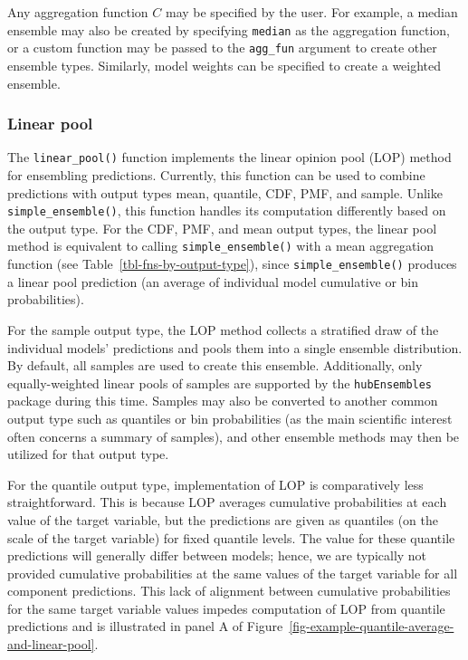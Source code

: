 \documentclass[
  letterpaper,
  DIV=11,
  numbers=noendperiod]{scrartcl}
\begin{document}
Any aggregation function \(C\) may be specified by the user. For
example, a median ensemble may also be created by specifying
\texttt{median} as the aggregation function, or a custom function may be
passed to the \texttt{agg\_fun} argument to create other ensemble types.
Similarly, model weights can be specified to create a weighted ensemble.

\subsubsection{Linear pool}\label{sec-linear-pool}

The \texttt{linear\_pool()} function implements the linear opinion pool
(LOP) method for ensembling predictions. Currently, this function can be
used to combine predictions with output types mean, quantile, CDF, PMF,
and sample. Unlike \texttt{simple\_ensemble()}, this function handles
its computation differently based on the output type. For the CDF, PMF,
and mean output types, the linear pool method is equivalent to calling
\texttt{simple\_ensemble()} with a mean aggregation function (see
Table~\ref{tbl-fns-by-output-type}), since \texttt{simple\_ensemble()}
produces a linear pool prediction (an average of individual model
cumulative or bin probabilities).

For the sample output type, the LOP method collects a stratified draw of
the individual models' predictions and pools them into a single ensemble
distribution. By default, all samples are used to create this ensemble.
Additionally, only equally-weighted linear pools of samples are
supported by the \texttt{hubEnsembles} package during this time. Samples
may also be converted to another common output type such as quantiles or
bin probabilities (as the main scientific interest often concerns a
summary of samples), and other ensemble methods may then be utilized for
that output type.

For the quantile output type, implementation of LOP is comparatively
less straightforward. This is because LOP averages cumulative
probabilities at each value of the target variable, but the predictions
are given as quantiles (on the scale of the target variable) for fixed
quantile levels. The value for these quantile predictions will generally
differ between models; hence, we are typically not provided cumulative
probabilities at the same values of the target variable for all
component predictions. This lack of alignment between cumulative
probabilities for the same target variable values impedes computation of
LOP from quantile predictions and is illustrated in panel A of
Figure~\ref{fig-example-quantile-average-and-linear-pool}.
\end{document}
